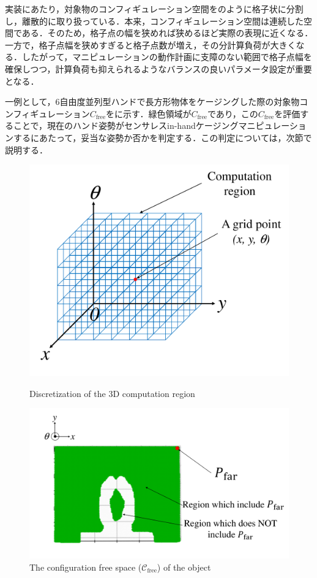 \documentclass[a4paper,twoside,12pt,papersize, dvipdfmx]{iirthesis}
\begin{document}
実装にあたり，対象物のコンフィギュレーション空間をのように格子状に分割し，離散的に取り扱っている．本来，コンフィギュレーション空間は連続した空間である．そのため，格子点の幅を狭めれば狭めるほど実際の表現に近くなる．一方で，格子点幅を狭めすぎると格子点数が増え，その分計算負荷が大きくなる．したがって，マニピュレーションの動作計画に支障のない範囲で格子点幅を確保しつつ，計算負荷も抑えられるようなバランスの良いパラメータ設定が重要となる．\par

一例として，6自由度並列型ハンドで長方形物体をケージングした際の対象物コンフィギュレーション$C_{\mathrm{free}}$をに示す．緑色領域が$C_{\mathrm{free}}$であり，この$C_{\mathrm{free}}$を評価することで，現在のハンド姿勢がセンサレスin-handケージングマニピュレーションするにあたって，妥当な姿勢か否かを判定する．この判定については，次節で説明する．

\begin{figure}[hb]
\centering
\includegraphics[width=0.6\hsize]{fig/2-sensorless-icm/DiscretizeSpace.pdf}
\caption{Discretization of the 3D computation region \cite{komiyama2021}}
\label{fig::sicm::discretize}

\includegraphics[width=0.7\hsize]{fig/2-sensorless-icm/cfree.pdf}
\caption{The configuration free space ($\mathcal{C}_{\mathrm{free}}$) of the object \cite{komiyama2021}}
\label{fig::sicm::cfreeexam}
\end{figure}
\end{document}
